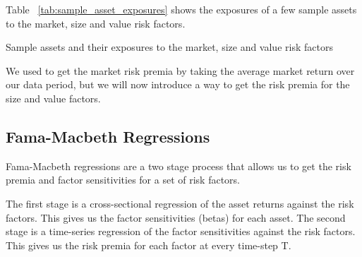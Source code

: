 Table ~\ref{tab:sample_asset_exposures} shows the exposures of a few sample assets to the market, size and value risk factors.

\begin{table}
    \centering
    
    \caption{Sample assets and their exposures to the market, size and value risk factors}
    \label{tab:sample_asset_exposures}
\end{table}

We used to get the market risk premia by taking the average market return over our data period, but we will now introduce a way to get
the risk premia for the size and value factors.

\subsection{Fama-Macbeth Regressions}
Fama-Macbeth regressions are a two stage process that allows us to get the risk premia and factor sensitivities for a set of risk factors.

The first stage is a cross-sectional regression of the asset returns against the risk factors.
This gives us the factor sensitivities (betas) for each asset.
The second stage is a time-series regression of the factor sensitivities against the risk factors.
This gives us the risk premia for each factor at every time-step T.

